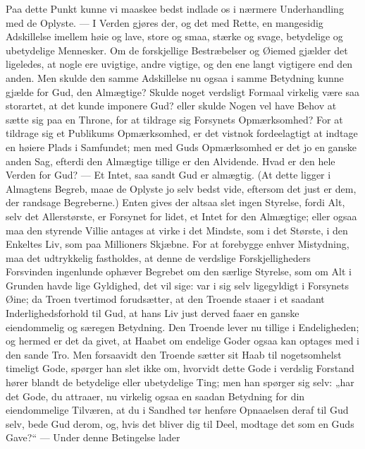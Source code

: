\documentclass[12pt,a4paper]{book}
\begin{document}
Paa dette Punkt kunne vi maaskee bedst indlade os i nærmere
Underhandling med de Oplyste. --- I Verden gjøres der, og det med
Rette, en mangesidig Adskillelse imellem høie og lave, store og smaa,
stærke og svage, betydelige og ubetydelige Mennesker. Om de forskjellige
Bestræbelser og Øiemed gjælder det ligeledes, at nogle ere uvigtige,
andre vigtige, og den ene langt vigtigere end den anden. Men skulde den
samme Adskillelse nu ogsaa i samme Betydning kunne
gjælde for Gud, den Almægtige? Skulde noget verdsligt Formaal virkelig
være saa storartet, at det kunde imponere Gud? eller skulde Nogen vel
have Behov at sætte sig paa en Throne, for at tildrage sig Forsynets
Opmærksomhed? For at tildrage sig et Publikums Opmærksomhed, er det
vistnok fordeelagtigt at indtage en høiere Plads i Samfundet; men med
Guds Opmærksomhed er det jo en ganske anden Sag, efterdi den Almægtige
tillige er den Alvidende. Hvad er den hele Verden for Gud? --- Et
Intet, saa sandt Gud er almægtig. (At dette ligger i Almagtens Begreb,
maae de Oplyste jo selv bedst vide, eftersom det just er dem, der
randsage Begreberne.) Enten gives der altsaa slet ingen Styrelse, fordi
Alt, selv det Allerstørste, er Forsynet for lidet, et Intet for den
Almægtige; eller ogsaa maa den styrende Villie antages at virke i det
Mindste, som i det Største, i den Enkeltes Liv, som paa Millioners
Skjæbne. For at forebygge enhver Mistydning, maa det udtrykkelig
fastholdes, at denne de verdslige Forskjelligheders Forsvinden
ingenlunde ophæver Begrebet om den særlige Styrelse, som om Alt i
Grunden havde lige Gyldighed, det vil sige: var i sig selv ligegyldigt
i Forsynets Øine; da Troen tvertimod forudsætter, at den Troende staaer
i et saadant Inderlighedsforhold til Gud, at hans Liv just derved faaer
en ganske eiendommelig og særegen Betydning. Den Troende lever nu
tillige i Endeligheden; og hermed er det da givet, at Haabet om
endelige Goder ogsaa kan optages med i den sande Tro. Men forsaavidt
den Troende sætter sit Haab til nogetsomhelst timeligt Gode, spørger
han slet ikke om, hvorvidt dette Gode i verdslig Forstand hører blandt
de betydelige eller ubetydelige Ting; men han spørger sig selv:
„har det Gode, du attraaer, nu virkelig ogsaa en saadan Betydning for
din eiendommelige Tilværen, at du i Sandhed tør henføre Opnaaelsen
deraf til Gud selv, bede Gud derom, og, hvis det bliver dig til
Deel, modtage det som en Guds Gave?“ --- Under denne Betingelse lader
\end{document}
